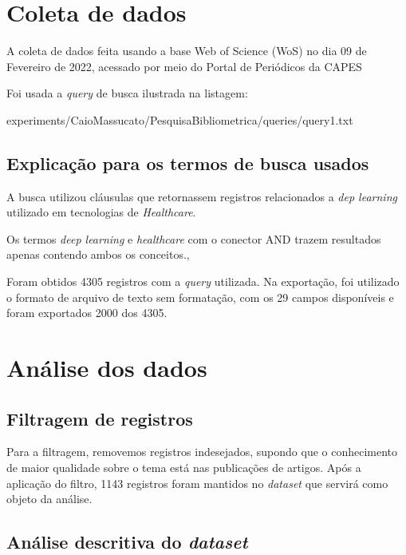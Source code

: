 \section{Coleta de dados\label{MASSA:coleta}}

A coleta de dados feita usando a base Web of Science (WoS) no dia 09 de Fevereiro de 2022, acessado por meio do Portal de Periódicos da CAPES

Foi usada a \textit{query} de busca ilustrada na listagem:


{experiments/CaioMassucato/PesquisaBibliometrica/queries/query1.txt}

\subsection{Explicação para os termos de busca usados\label{sec:CaioMassucato:query}}

A busca utilizou cláusulas que retornassem registros relacionados a \textit{dep learning} utilizado em tecnologias de \textit{Healthcare}.

Os termos \textit{deep learning} e \textit{healthcare} com o conector AND trazem resultados apenas contendo ambos os conceitos., 

Foram obtidos 4305 registros com a \textit{query} utilizada. Na exportação, foi utilizado o formato de arquivo de texto sem formatação, com os 29 campos disponíveis e foram exportados 2000 dos 4305.

\section{Análise dos dados}

\subsection{Filtragem de registros}

Para a filtragem, removemos registros indesejados, supondo que o conhecimento de maior qualidade sobre o tema está nas publicações de artigos. Após a aplicação do filtro, 1143 registros foram mantidos no \textit{dataset} que servirá como objeto da análise.

\subsection{Análise descritiva do \textit{dataset} }

